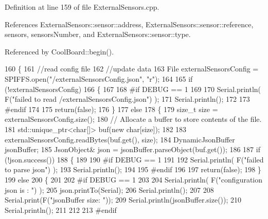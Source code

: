 Definition at line 159 of file External\+Sensors.\+cpp.



References External\+Sensors\+::sensor\+::address, External\+Sensors\+::sensor\+::reference, sensors, sensors\+Number, and External\+Sensors\+::sensor\+::type.



Referenced by Cool\+Board\+::begin().


\begin{DoxyCode}
160 \{
161     \textcolor{comment}{//read config file}
162     \textcolor{comment}{//update data}
163     File externalSensorsConfig = SPIFFS.open(\textcolor{stringliteral}{"/externalSensorsConfig.json"}, \textcolor{stringliteral}{"r"});
164 
165     \textcolor{keywordflow}{if} (!externalSensorsConfig) 
166     \{
167     
168 \textcolor{preprocessor}{    #if DEBUG == 1}
169         
170         Serial.println( F(\textcolor{stringliteral}{"failed to read /externalSensorsConfig.json"}) );
171         Serial.println();
172     
173 \textcolor{preprocessor}{    #endif}
174         
175         \textcolor{keywordflow}{return}(\textcolor{keyword}{false});
176     \}
177     \textcolor{keywordflow}{else}
178     \{
179         \textcolor{keywordtype}{size\_t} size = externalSensorsConfig.size();
180         \textcolor{comment}{// Allocate a buffer to store contents of the file.}
181         std::unique\_ptr<char[]> buf(\textcolor{keyword}{new} \textcolor{keywordtype}{char}[size]);
182 
183         externalSensorsConfig.readBytes(buf.get(), size);
184         DynamicJsonBuffer jsonBuffer;
185         JsonObject& json = jsonBuffer.parseObject(buf.get());
186 
187         \textcolor{keywordflow}{if} (!json.success()) 
188         \{
189         
190 \textcolor{preprocessor}{        #if DEBUG == 1 }
191 
192             Serial.println( F(\textcolor{stringliteral}{"failed to parse json"}) );
193             Serial.println();
194         
195 \textcolor{preprocessor}{        #endif}
196 
197             \textcolor{keywordflow}{return}(\textcolor{keyword}{false});
198         \} 
199         \textcolor{keywordflow}{else}
200         \{
201         
202 \textcolor{preprocessor}{        #if DEBUG == 1 }
203     
204             Serial.println( F(\textcolor{stringliteral}{"configuration json is : "}) );
205             json.printTo(Serial);
206             Serial.println();
207 
208             Serial.print(F(\textcolor{stringliteral}{"jsonBuffer size: "}));
209             Serial.println(jsonBuffer.size());
210             Serial.println();
211 
212         
213 \textcolor{preprocessor}{        #endif          }

\end{DoxyCode}
